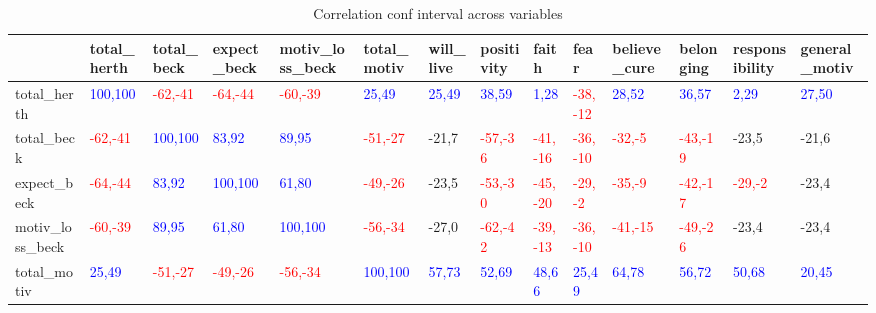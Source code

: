 \begin{table}[H] 
\tiny 
 \caption{Correlation conf interval across variables} 
 \label{correlation_conf_interval_across_variables} 
 \centering 
 \begin{adjustbox}{angle=270}  
 \begin{tabular} {|l|l|l|l|l|l|l|l|l|l|l|l|l|l|}  
 \hline 
  &  total\_herth & total\_beck & expect\_beck & motiv\_loss\_beck & total\_motiv & will\_live & positivity & faith & fear & believe\_cure & belonging & responsibility & general\_motiv \\ 
 \hline 
 total\_herth & {\textcolor{blue}{100,100}} & {\textcolor{red}{-62,-41}} & {\textcolor{red}{-64,-44}} & {\textcolor{red}{-60,-39}} & {\textcolor{blue}{25,49}} & {\textcolor{blue}{25,49}} & {\textcolor{blue}{38,59}} & {\textcolor{blue}{1,28}} & {\textcolor{red}{-38,-12}} & {\textcolor{blue}{28,52}} & {\textcolor{blue}{36,57}} & {\textcolor{blue}{2,29}} & {\textcolor{blue}{27,50}} \\ 
 \hline 
 total\_beck & {\textcolor{red}{-62,-41}} & {\textcolor{blue}{100,100}} & {\textcolor{blue}{83,92}} & {\textcolor{blue}{89,95}} & {\textcolor{red}{-51,-27}} & -21,7 & {\textcolor{red}{-57,-36}} & {\textcolor{red}{-41,-16}} & {\textcolor{red}{-36,-10}} & {\textcolor{red}{-32,-5}} & {\textcolor{red}{-43,-19}} & -23,5 & -21,6 \\ 
 \hline 
 expect\_beck & {\textcolor{red}{-64,-44}} & {\textcolor{blue}{83,92}} & {\textcolor{blue}{100,100}} & {\textcolor{blue}{61,80}} & {\textcolor{red}{-49,-26}} & -23,5 & {\textcolor{red}{-53,-30}} & {\textcolor{red}{-45,-20}} & {\textcolor{red}{-29,-2}} & {\textcolor{red}{-35,-9}} & {\textcolor{red}{-42,-17}} & {\textcolor{red}{-29,-2}} & -23,4 \\ 
 \hline 
 motiv\_loss\_beck & {\textcolor{red}{-60,-39}} & {\textcolor{blue}{89,95}} & {\textcolor{blue}{61,80}} & {\textcolor{blue}{100,100}} & {\textcolor{red}{-56,-34}} & -27,0 & {\textcolor{red}{-62,-42}} & {\textcolor{red}{-39,-13}} & {\textcolor{red}{-36,-10}} & {\textcolor{red}{-41,-15}} & {\textcolor{red}{-49,-26}} & -23,4 & -23,4 \\ 
 \hline 
 total\_motiv & {\textcolor{blue}{25,49}} & {\textcolor{red}{-51,-27}} & {\textcolor{red}{-49,-26}} & {\textcolor{red}{-56,-34}} & {\textcolor{blue}{100,100}} & {\textcolor{blue}{57,73}} & {\textcolor{blue}{52,69}} & {\textcolor{blue}{48,66}} & {\textcolor{blue}{25,49}} & {\textcolor{blue}{64,78}} & {\textcolor{blue}{56,72}} & {\textcolor{blue}{50,68}} & {\textcolor{blue}{20,45}} \\ 

\end{tabular}
\end{adjustbox}
\end{table}
